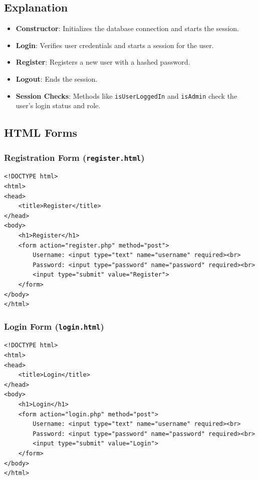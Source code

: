 \documentclass[11pt]{article}
\begin{document}
\subsection*{Explanation}
\label{sec:orgc6d32ed}
\begin{itemize}
\item \textbf{Constructor}: Initializes the database connection and starts the
session.
\item \textbf{Login}: Verifies user credentials and starts a session for the user.
\item \textbf{Register}: Registers a new user with a hashed password.
\item \textbf{Logout}: Ends the session.
\item \textbf{Session Checks}: Methods like \texttt{isUserLoggedIn} and \texttt{isAdmin} check
the user's login status and role.
\end{itemize}

\subsection*{HTML Forms}
\label{sec:org5b5f2bf}
\subsubsection*{Registration Form (\texttt{register.html})}
\label{sec:org275d539}
\begin{verbatim}
<!DOCTYPE html>
<html>
<head>
    <title>Register</title>
</head>
<body>
    <h1>Register</h1>
    <form action="register.php" method="post">
        Username: <input type="text" name="username" required><br>
        Password: <input type="password" name="password" required><br>
        <input type="submit" value="Register">
    </form>
</body>
</html>
\end{verbatim}

\subsubsection*{Login Form (\texttt{login.html})}
\label{sec:org83b4fb1}
\begin{verbatim}
<!DOCTYPE html>
<html>
<head>
    <title>Login</title>
</head>
<body>
    <h1>Login</h1>
    <form action="login.php" method="post">
        Username: <input type="text" name="username" required><br>
        Password: <input type="password" name="password" required><br>
        <input type="submit" value="Login">
    </form>
</body>
</html>
\end{verbatim}
\end{document}
